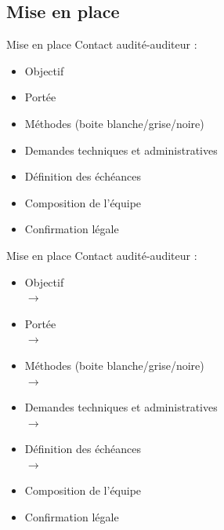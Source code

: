 \documentclass{beamer}
\newcommand{\colorized}[1]{{\color{red}{#1}}}
\begin{document}
\subsection{Mise en place}
\begin{frame}{Mise en place}
	Contact audité-auditeur : 
	\begin{itemize}
		\item Objectif
		\item Portée 
		\item Méthodes (boite blanche/grise/noire) 
		\item Demandes techniques et administratives 
		\item Définition des échéances 
		\item Composition de l'équipe 
		\item Confirmation légale 
	\end{itemize}		
\end{frame}
\begin{frame}{Mise en place}
	Contact audité-auditeur : 
	\begin{itemize}
		\item Objectif \\
		      $\rightarrow$ \colorized{vérifier des vulnérabilités de l'OWASP TOP 10}
		\item Portée \\
		      $\rightarrow$ \colorized{application web DVWA (en local)}
		\item Méthodes (boite blanche/grise/noire) \\
		      $\rightarrow$ \colorized{boite blanche}
		\item Demandes techniques et administratives \\
		      $\rightarrow$ \colorized{code source}
		\item Définition des échéances \\
		      $\rightarrow$ \colorized{\today}
		\item Composition de l'équipe 
		\item Confirmation légale 
	\end{itemize}		
\end{frame}
\end{document}
